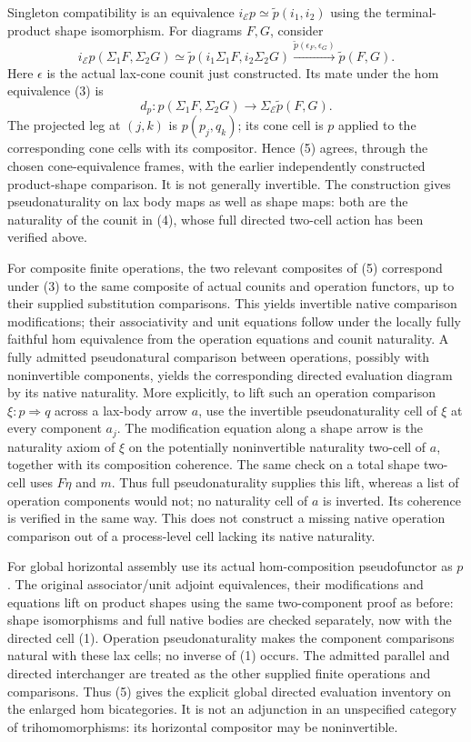 \documentclass{article}
\begin{document}
Singleton compatibility is an equivalence
$i_{\mathcal E}p\simeq\widetilde p(i_1,i_2)$ using the terminal-product shape isomorphism. For diagrams $F,G$, consider
\[
 i_{\mathcal E}p(\Sigma_1F,\Sigma_2G)
 \simeq\widetilde p(i_1\Sigma_1F,i_2\Sigma_2G)
 \xrightarrow{\widetilde p(\epsilon_F,\epsilon_G)}
 \widetilde p(F,G).
\tag{4}
\]
Here $\epsilon$ is the actual lax-cone counit just constructed. Its mate under the hom equivalence (3) is
\[
 d_p:p(\Sigma_1F,\Sigma_2G)\longrightarrow
 \Sigma_{\mathcal E}\widetilde p(F,G).
\tag{5}
\]
The projected leg at $(j,k)$ is $p(p_j,q_k)$; its cone cell is $p$ applied to the corresponding cone cells with its compositor. Hence (5) agrees, through the chosen cone-equivalence frames, with the earlier independently constructed product-shape comparison. It is not generally invertible. The construction gives pseudonaturality on lax body maps as well as shape maps: both are the naturality of the counit in (4), whose full directed two-cell action has been verified above.

For composite finite operations, the two relevant composites of (5) correspond under (3) to the same composite of actual counits and operation functors, up to their supplied substitution comparisons. This yields invertible native comparison modifications; their associativity and unit equations follow under the locally fully faithful hom equivalence from the operation equations and counit naturality. A fully admitted pseudonatural comparison between operations, possibly with noninvertible components, yields the corresponding directed evaluation diagram by its native naturality. More explicitly, to lift such an operation comparison $\xi:p\Rightarrow q$ across a lax-body arrow $a$, use the invertible pseudonaturality cell of $\xi$ at every component $a_j$. The modification equation along a shape arrow is the naturality axiom of $\xi$ on the potentially noninvertible naturality two-cell of $a$, together with its composition coherence. The same check on a total shape two-cell uses $F\eta$ and $m$. Thus full pseudonaturality supplies this lift, whereas a list of operation components would not; no naturality cell of $a$ is inverted. Its coherence is verified in the same way. This does not construct a missing native operation comparison out of a process-level cell lacking its native naturality.

For global horizontal assembly use its actual hom-composition pseudofunctor as $p$. The original associator/unit adjoint equivalences, their modifications and equations lift on product shapes using the same two-component proof as before: shape isomorphisms and full native bodies are checked separately, now with the directed cell (1). Operation pseudonaturality makes the component comparisons natural with these lax cells; no inverse of (1) occurs. The admitted parallel and directed interchanger are treated as the other supplied finite operations and comparisons. Thus (5) gives the explicit global directed evaluation inventory on the enlarged hom bicategories. It is not an adjunction in an unspecified category of trihomomorphisms: its horizontal compositor may be noninvertible.
\end{document}
